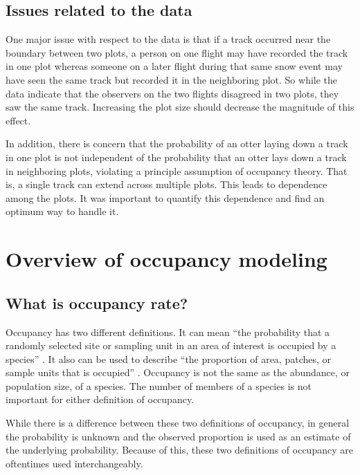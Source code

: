 \documentclass[12pt]{article}
\begin{document}
    \subsection{Issues related to the data}
    One major issue with respect to the data is that if a track occurred near
    the boundary between two plots, a person on one flight may have recorded the
    track in one plot whereas someone on a later flight during that same snow
    event may have seen the same track but recorded it in the neighboring plot.
    So while the data indicate that the observers on the two flights disagreed
    in two plots, they saw the same track. Increasing the plot size should
    decrease the magnitude of this effect.

    In addition, there is concern that the probability of an otter laying down a
    track in one plot is not independent of the probability that an otter lays
    down a track in neighboring plots, violating a principle assumption of
    occupancy theory. That is, a single track can extend across multiple plots.
    This leads to dependence among the plots. It was important to quantify this
    dependence and find an optimum way to handle it.

\section{Overview of occupancy modeling}

    \subsection{What is occupancy rate?}
    Occupancy has two different definitions. It can mean ``the probability that
    a randomly selected site or sampling unit in an area of interest is occupied
    by a species'' \cite{MacKenzie2006}. It also can be used to describe ``the
    proportion of area, patches, or sample units that is occupied''
    \cite{MacKenzie2006}. Occupancy is not the same as the abundance, or
    population size, of a species. The number of members of a species is not
    important for either definition of occupancy.

    While there is a difference between these two definitions of occupancy, in
    general the probability is unknown and the observed proportion is used as an
    estimate of the underlying probability. Because of this, these two
    definitions of occupancy are oftentimes used interchangeably.
\end{document}
